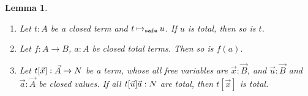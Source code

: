 \documentclass{article}
\newtheorem{lemma}[theorem]{Lemma}
\begin{document}
\begin{lemma}\label{lem:total_value}
  \begin{enumerate}
  \item\label{lem:total_value1}
    Let $t:A$ be a closed term and $t \mathbin{\mathbin{\mapsto}_{\hbox{\scriptsize \tt safe}}} u$.
    If $u$ is total, then so is $t$.
  \item\label{lem:total_value1bis}
    Let $f:A \rightarrow B$, $a:A$ be closed \emph{total} terms.
    Then so is $f(a)$.
  \item\label{lem:total_value2}
    Let $t[\vec{x}]:\vec{A}\rightarrow{N}$ be a term,
    whose all free variables are $\vec{x}:\vec{B}$,
    and $\vec{u}:\vec{B}$ and $\vec{a}:\vec{A}$ be closed values.
    If all $t[\vec{u}]\vec{a}:{N}$ are total, then $t[\vec{x}]$ is total. 
  \end{enumerate}
\end{lemma}
\end{document}
